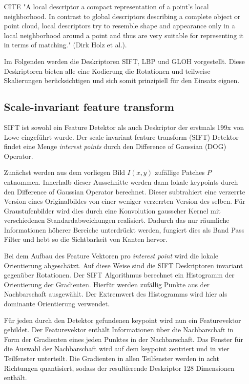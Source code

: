 CITE "A local descriptor a compact representation of a point’s local neighborhood. In contrast to global descriptors describing a complete object or point cloud, local descriptors try to resemble shape and appearance only in a local neighborhood around a point and thus are very suitable for representing it in terms of matching." (Dirk Holz et al.).

Im Folgenden werden die Deskriptoren SIFT, LBP und GLOH vorgestellt. Diese Deskriptoren bieten alle eine Kodierung die Rotationen und teilweise Skalierungen berücksichtigen und sich somit prinzipiell für den Einsatz eignen.

\cite{ifd2016}

\subsection{Scale-invariant feature transform}

SIFT ist sowohl ein Feature Detektor als auch Deskriptor der erstmals 199x von Lowe eingeführt wurde. Der scale-invariant feature transform (SIFT) Detektor findet eine Menge \textit{interest points} durch den Difference of Gaussian (DOG) Operator. 

Zunächst werden aus dem vorliegen Bild $I(x, y)$ zufällige Patches $P$ entnommen. Innerhalb dieser Ausschnitte werden dann lokale keypoints durch den Difference of Gaussian Operator berechnet. Dieser subtrahiert eine verzerrte Version eines Originalbildes von einer weniger verzerrten Version des selben. Für Graustufenbilder wird dies durch eine Konvolution gausscher Kernel mit verschiedenen Standardabweichungen realisiert. Dadurch das nur räumliche Informationen höherer Bereiche unterdrückt werden, fungiert dies als Band Pass Filter und hebt so die Sichtbarkeit von Kanten hervor.

Bei dem Aufbau des Feature Vektoren pro \textit{interest point} wird die lokale Orientierung abgeschätzt. Auf diese Weise sind die SIFT Deskriptoren invariant gegenüber Rotationen. Der SIFT Algorithmus berechnet ein Histogramm der Orientierung der Gradienten. Hierfür werden zufällig Punkte aus der Nachbarschaft ausgewählt. Der Extremwert des Histogramms wird hier als dominante Orientierung verwendet.

Für jeden durch den Detektor gefundenen keypoint wird nun ein Featurevektor gebildet. Der Featurevektor enthält Informationen über die Nachbarschaft in Form der Gradienten eines jeden Punktes in der Nachbarschaft. Das Fenster für die Auswahl der Nachbarschaft wird auf dem keypoint zentriert und in vier Teilfenster unterteilt. Die Gradienten in allen Teilfenster werden in acht Richtungen quantisiert, sodass der resultierende Deskriptor 128 Dimensionen enthält.

